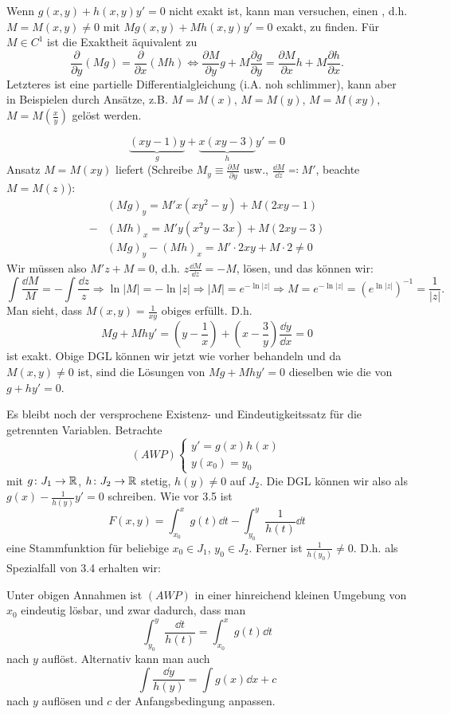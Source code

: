 \begin{bemerkung}
	Wenn $ g(x,y)+h(x,y)y'=0 $ nicht exakt ist, kann man versuchen, einen , d.h. $ M=M(x,y)\neq 0 $ mit $ Mg(x,y)+Mh(x,y)y'=0 $ exakt, zu finden. F\"ur $ M\in C^1 $ ist die Exaktheit \"aquivalent zu
	\[ \frac{\partial }{\partial y}(Mg)=\frac{\partial}{\partial x}(Mh)\Leftrightarrow\frac{\partial M}{\partial y}g+M\frac{\partial g}{\partial y}=\frac{\partial M}{\partial x}h+M\frac{\partial h}{\partial x}. \]
	Letzteres ist eine partielle Differentialgleichung (i.A. noh schlimmer), kann aber in Beispielen durch Ans\"atze, z.B. $ M=M(x) $, $ M=M(y) $, $ M=M(xy) $, $ M=M\left(\frac{x}{y}\right) $ gel\"ost werden.
\end{bemerkung}
\newpage
\begin{beispiel}
	\[ \underbrace{(xy-1)y}_{g}+\underbrace{x(xy-3)}_{h}y'=0 \]
	Ansatz $ M=M(xy) $ liefert (Schreibe $ M_y\equiv\frac{\partial M}{\partial y} $ usw., $ \frac{\dd M}{\dd z}\eqqcolon M' $, beachte $ M=M(z) $):
	\begin{align*} &(Mg)_y=M'x(xy^2-y)+M(2xy-1)\\ 
	 -&(Mh)_x=M'y(x^2y-3x)+M(2xy-3)\\
	 &(Mg)_y-(Mh)_x=M'\cdot 2xy+M\cdot 2\neq 0 \end{align*}
	 Wir m\"ussen also $ M'z+M=0 $, d.h. $ z\frac{\dd M}{\dd z}=-M $, l\"osen, und das k\"onnen wir:
	 \[ \int\frac{\dd M}{M}=-\int\frac{\dd z}{z}\Rightarrow\ln |M|=-\ln|z|\Rightarrow|M|=e^{-\ln|z|}\Rightarrow M=e^{-\ln|z|}=(e^{\ln|z|})^{-1}=\frac{1}{|z|}. \]
	 Man sieht, dass $ M(x,y)=\frac{1}{xy} $ obiges erf\"ullt. D.h.
	 \[ Mg+Mhy'=\left(y-\frac{1}{x}\right)+\left(x-\frac{3}{y}\right)\frac{\dd y}{\dd x}=0 \]
	 ist exakt. Obige DGL k\"onnen wir jetzt wie vorher behandeln und da $ M(x,y)\neq 0 $ ist, sind die L\"osungen von $ Mg+Mhy'=0 $ dieselben wie die von $ g+hy'=0 $.
\end{beispiel}
Es bleibt noch der versprochene Existenz- und Eindeutigkeitssatz f\"ur die getrennten Variablen. Betrachte
\[ (AWP)\begin{cases}
y'=g(x)h(x)\\ y(x_0)=y_0
\end{cases} \]
mit $ g\colon J_1\rightarrow\mathbb{R} $, $ h\colon J_2\rightarrow\mathbb{R} $ stetig, $ h(y)\neq 0 $ auf $ J_2 $. Die DGL k\"onnen wir also als $ g(x)-\frac{1}{h(y)}y'=0 $ schreiben. Wie vor 3.5 ist
\[ F(x,y)=\int_{x_0}^x g(t)\dd t-\int_{y_0}^y\frac{1}{h(t)}\dd t \]
eine Stammfunktion f\"ur beliebige $ x_0\in J_1 $, $ y_0\in J_2 $. Ferner ist $ \frac{1}{h(y_0)}\neq 0 $. D.h. als Spezialfall von 3.4 erhalten wir:
\begin{satz}
	Unter obigen Annahmen ist $ (AWP) $ in einer hinreichend kleinen Umgebung von $ x_0 $ eindeutig l\"osbar, und zwar dadurch, dass man
	\[ \int_{y_0}^y\frac{\dd t}{h(t)}=\int_{x_0}^x g(t)\dd t \]
	nach $ y $ aufl\"ost. Alternativ kann man auch
	\[ \int\frac{\dd y}{h(y)}=\int g(x)\dd x+c \]
	nach $ y $ aufl\"osen und $ c $ der Anfangsbedingung anpassen.
\end{satz}

